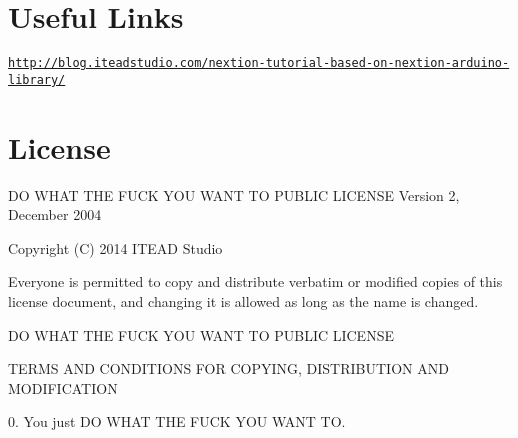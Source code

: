 \section*{Useful Links}

\href{http://blog.iteadstudio.com/nextion-tutorial-based-on-nextion-arduino-library/}{\tt http\+://blog.\+iteadstudio.\+com/nextion-\/tutorial-\/based-\/on-\/nextion-\/arduino-\/library/}

\section*{License}





\begin{DoxyVerb}DO WHAT THE FUCK YOU WANT TO PUBLIC LICENSE 
    Version 2, December 2004 

Copyright (C) 2014 ITEAD Studio

Everyone is permitted to copy and distribute verbatim or modified 
copies of this license document, and changing it is allowed as long 
as the name is changed. 

    DO WHAT THE FUCK YOU WANT TO PUBLIC LICENSE 

TERMS AND CONDITIONS FOR COPYING, DISTRIBUTION AND MODIFICATION 

0. You just DO WHAT THE FUCK YOU WANT TO.
\end{DoxyVerb}




 
